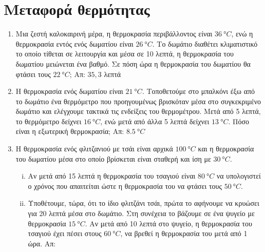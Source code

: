 


\pagestyle{askhseis}
\everymath{\displaystyle}





\begin{center}
\end{center}

\vspace{\baselineskip}

\section*{Μεταφορά θερμότητας}

\begin{enumerate}
  \item Μια ζεστή καλοκαιρινή μέρα, η θερμοκρασία περιβάλλοντος είναι 
    $ \SI{36}{\degree C} $, ενώ η θερμοκρασία εντός ενός δωματίου είναι 
    $ \SI{26}{\degree C} $. Το δωμάτιο διαθέτει κλιματιστικό το οποίο τίθεται 
    σε λειτουργία και μέσα σε 10 λεπτά, η θερμοκρασία του δωματίου μειώνεται ένα βαθμό. 
    Σε πόση ώρα η θερμοκρασία του δωματίου θα φτάσει τους $ \SI{22}{\degree C} $; 
    \hfill Απ: $ 35,3 $ λεπτά 

  \item Η θερμοκρασία ενός δωματίου είναι $ \SI{21}{\degree C} $. Τοποθετούμε στο 
    μπαλκόνι έξω από το δωμάτιο ένα θερμόμετρο που προηγουμένως βρισκόταν μέσα στο 
    συγκεκριμένο δωμάτιο και ελέγχουμε τακτικά τις ενδείξεις του θερμομέτρου. Μετά 
    από 5 λεπτά, το θερμόμετρο δείχνει $ \SI{16}{\degree C} $, ενώ μετά από άλλα 
    5 λεπτά δείχνει $ \SI{13}{\degree C} $. Πόσο είναι η εξωτερική θερμοκρασία;
    \hfill Απ: $ \SI{8,5}{\degree C} $ 

  \item Η θερμοκρασία ενός φλιτζανιού με τσάι είναι αρχικά $ \SI{100}{\degree C} $ και 
    η θερμοκρασία του δωματίου μέσα στο οποίο βρίσκεται είναι σταθερή και ίση με 
    $ \SI{30}{\degree C} $. 
    \begin{enumerate}[i)]
      \item Αν μετά από 15 λεπτά η θερμοκρασία του τσαγιού είναι $ \SI{80}{\degree C} $ 
        να υπολογιστεί ο χρόνος που απαιτείται ώστε η θερμοκρασία του να φτάσει τους 
        $ \SI{50}{\degree C} $. 
      \item Υποθέτουμε, τώρα, ότι το ίδιο φλιτζάνι τσάι, πρώτα το αφήνουμε να κρυώσει 
        για 20 λεπτά μέσα στο δωμάτιο. Στη συνέχεια το βάζουμε σε ένα ψυγείο 
        με θερμοκρασία $ \SI{15}{\degree C} $. Αν μετά από 10 λεπτά στο ψυγείο, 
        η θερμοκρασία του τσαγιού έχει πέσει στους $ \SI{60}{\degree C} $, να 
        βρεθεί η θερμοκρασία του μετά από 1 ώρα. 
        \hfill Απ: 
    \end{enumerate}
\end{enumerate}


